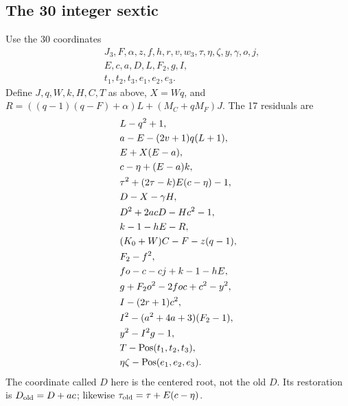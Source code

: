 \subsection{The 30 integer sextic}
Use the 30 coordinates
\[
\begin{split}
&J_3,F,\alpha,z,f,h,r,v,w_3,\tau,\eta,\zeta,y,\gamma,o,j,\\
&E,c,a,D,L,F_2,g,I,\\
&t_1,t_2,t_3,e_1,e_2,e_3.
\end{split}
\]
Define $J,q,W,k,H,C,T$ as above, $X=Wq$, and
$R=((q-1)(q-F)+\alpha)L+(M_C+qM_F)J$. The 17 residuals are
\begin{align*}
 &L-q^2+1,\\
 &a-E-(2v+1)q(L+1),\\
 &E+X(E-a),\\
 &c-\eta+(E-a)k,\\
 &\tau^2+(2\tau-k)E(c-\eta)-1,\\
 &D-X-\gamma H,\\
 &D^2+2acD-Hc^2-1,\\
 &k-1-hE-R,\\
 &(K_0+W)C-F-z(q-1),\\
 &F_2-f^2,\\
 &fo-c-cj+k-1-hE,\\
 &g+F_2o^2-2foc+c^2-y^2,\\
 &I-(2r+1)c^2,\\
 &I^2-(a^2+4a+3)(F_2-1),\\
 &y^2-I^2g-1,\\
 &T-\operatorname{Pos}(t_1,t_2,t_3),\\
 &\eta\zeta-\operatorname{Pos}(e_1,e_2,e_3).
\end{align*}
The coordinate called $D$ here is the centered root, not the old $D$.
Its restoration is $D_{\rm old}=D+ac$; likewise
$\tau_{\rm old}=\tau+E(c-\eta)$.

